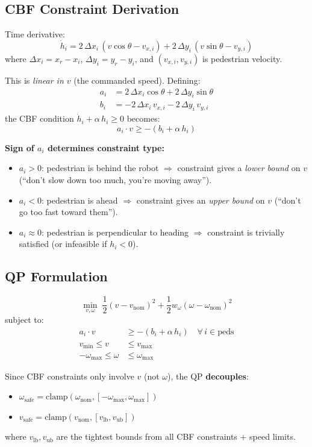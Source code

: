 \documentclass[11pt]{article}
\begin{document}
\subsection{CBF Constraint Derivation}

Time derivative:
\[
  \dot{h}_i = 2\,\Delta x_i\,(v\cos\theta - v_{x,i}) + 2\,\Delta y_i\,(v\sin\theta - v_{y,i})
\]
where $\Delta x_i = x_r - x_i$, $\Delta y_i = y_r - y_i$, and $(v_{x,i}, v_{y,i})$ is pedestrian velocity.

This is \emph{linear in $v$} (the commanded speed). Defining:
\begin{align}
  a_i &= 2\,\Delta x_i\cos\theta + 2\,\Delta y_i\sin\theta \\
  b_i &= -2\,\Delta x_i\, v_{x,i} - 2\,\Delta y_i\, v_{y,i}
\end{align}
the CBF condition $\dot{h}_i + \alpha\, h_i \geq 0$ becomes:
\[
  a_i \cdot v \geq -(b_i + \alpha\, h_i)
\]

\textbf{Sign of $a_i$ determines constraint type:}
\begin{itemize}
  \item $a_i > 0$: pedestrian is behind the robot $\Rightarrow$ constraint gives a \emph{lower bound} on $v$ (``don't slow down too much, you're moving away'').
  \item $a_i < 0$: pedestrian is ahead $\Rightarrow$ constraint gives an \emph{upper bound} on $v$ (``don't go too fast toward them'').
  \item $a_i \approx 0$: pedestrian is perpendicular to heading $\Rightarrow$ constraint is trivially satisfied (or infeasible if $h_i < 0$).
\end{itemize}

\subsection{QP Formulation}

\[
  \min_{v,\omega} \; \frac{1}{2}(v - v_{\text{nom}})^2 + \frac{1}{2}w_\omega(\omega - \omega_{\text{nom}})^2
\]
subject to:
\begin{align}
  a_i \cdot v &\geq -(b_i + \alpha\, h_i) \quad \forall\, i \in \text{peds} \\
  v_{\min} \leq v &\leq v_{\max} \\
  -\omega_{\max} \leq \omega &\leq \omega_{\max}
\end{align}

Since CBF constraints only involve $v$ (not $\omega$), the QP \textbf{decouples}:
\begin{itemize}
  \item $\omega_{\text{safe}} = \text{clamp}(\omega_{\text{nom}}, [-\omega_{\max}, \omega_{\max}])$
  \item $v_{\text{safe}} = \text{clamp}(v_{\text{nom}}, [v_{\text{lb}}, v_{\text{ub}}])$
\end{itemize}
where $v_{\text{lb}}, v_{\text{ub}}$ are the tightest bounds from all CBF constraints + speed limits.
\end{document}
